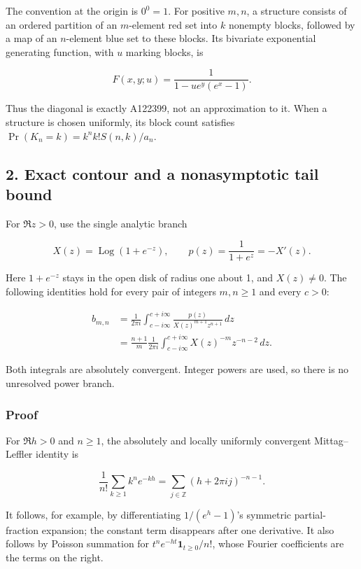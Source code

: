 \documentclass[11pt,letterpaper]{article}
\newcommand{\Log}{\operatorname{Log}}
\numberwithin{equation}{subsection}
\theoremstyle{definition}
\theoremstyle{remark}
\theoremstyle{plain}
\begin{document}
The convention at the origin is \(0^0=1\). For positive \(m,n\), a structure consists of an ordered partition of an \(m\)-element red set into \(k\) nonempty blocks, followed by a map of an \(n\)-element blue set to these blocks. Its bivariate exponential generating function, with \(u\) marking blocks, is

\[
 F(x,y;u)=\frac1{1-u e^y(e^x-1)}.
\]

Thus the diagonal is exactly A122399, not an approximation to it. When a structure is chosen uniformly, its block count satisfies \(\Pr(K_n=k)=k^n k!S(n,k)/a_n\).

\subsection{2. Exact contour and a nonasymptotic tail bound}\label{a122:exact-contour-and-a-nonasymptotic-tail-bound}

For \(\Re z>0\), use the single analytic branch

\[
 X(z)=\Log(1+e^{-z}),\qquad p(z)=\frac1{1+e^z}=-X'(z).
\]

Here \(1+e^{-z}\) stays in the open disk of radius one about 1, and \(X(z)\ne0\). The following identities hold for every pair of integers \(m,n\ge1\) and every \(c>0\):

\[
\begin{aligned}
 b_{m,n}&=\frac1{2\pi i}\int_{c-i\infty}^{c+i\infty}
 \frac{p(z)}{X(z)^{m+1}z^{n+1}}\,dz\\
 &=\frac{n+1}{m}\frac1{2\pi i}\int_{c-i\infty}^{c+i\infty}
 X(z)^{-m}z^{-n-2}\,dz.
\end{aligned}\tag{2.1}
\]

Both integrals are absolutely convergent. Integer powers are used, so there is no unresolved power branch.

\subsubsection{Proof}\label{a122:proof}

For \(\Re h>0\) and \(n\ge1\), the absolutely and locally uniformly convergent Mittag--Leffler identity is

\[
 \frac1{n!}\sum_{k\ge1}k^n e^{-kh}
 =\sum_{j\in\mathbb Z}(h+2\pi i j)^{-n-1}.\tag{2.2}
\]

It follows, for example, by differentiating \(1/(e^h-1)\)'s symmetric partial-fraction expansion; the constant term disappears after one derivative. It also follows by Poisson summation for \(t^n e^{-ht}\mathbf1_{t\ge0}/n!\), whose Fourier coefficients are the terms on the right.
\end{document}
